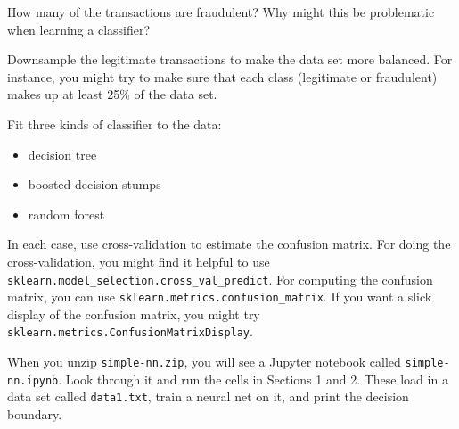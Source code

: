 \documentclass{article}
\begin{document}
\begin{probset}
\begin{progprob}
    \begin{subprobset}
    \begin{subprob}
        How many of the transactions are fraudulent? Why might this be problematic when learning a classifier?

        \begin{soln}

        \end{soln}
    \end{subprob}

    \begin{subprob}
        Downsample the legitimate transactions to make the data set more balanced. For instance, you might try to make sure that each class (legitimate or fraudulent) makes up at least 25\% of the data set.
    \end{subprob}

    \begin{subprob}
        Fit three kinds of classifier to the data:
        \begin{itemize}
            \item decision tree
            \item boosted decision stumps
            \item random forest
        \end{itemize}

        In each case, use cross-validation to estimate the confusion matrix. For doing the cross-validation, you might find it helpful to use \texttt{sklearn.model\_selection.cross\_val\_predict}. For computing the confusion matrix, you can use \texttt{sklearn.metrics.confusion\_matrix}. If you want a slick display of the confusion matrix, you might try \texttt{sklearn.metrics.ConfusionMatrixDisplay}.

        \begin{soln}

        \end{soln}
    \end{subprob}
    \end{subprobset}
\end{progprob}

\begin{progprob}
    When you unzip \texttt{simple-nn.zip}, you will see a Jupyter notebook called \texttt{simple-nn.ipynb}. Look through it and run the cells in Sections 1 and 2. These load in a data set called \texttt{data1.txt}, train a neural net on it, and print the decision boundary.


\end{progprob}
\end{probset}
\end{document}
